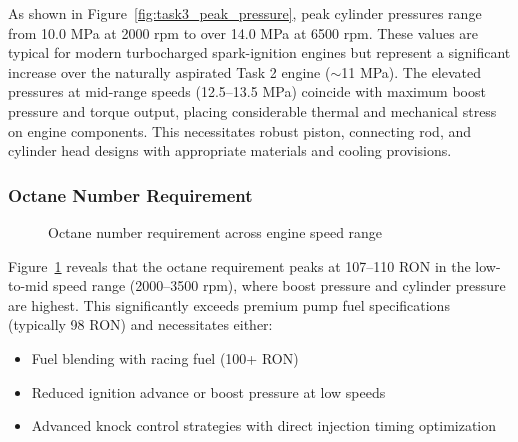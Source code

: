 As shown in Figure~\ref{fig:task3_peak_pressure}, peak cylinder pressures range from 10.0 MPa at 2000 rpm to over 14.0 MPa at 6500 rpm. These values are typical for modern turbocharged spark-ignition engines but represent a significant increase over the naturally aspirated Task 2 engine ($\sim$11 MPa). The elevated pressures at mid-range speeds (12.5--13.5 MPa) coincide with maximum boost pressure and torque output, placing considerable thermal and mechanical stress on engine components. This necessitates robust piston, connecting rod, and cylinder head designs with appropriate materials and cooling provisions.

\subsubsection{Octane Number Requirement}

\begin{figure}[H]
  \centering
  \caption{Octane number requirement across engine speed range}
  \label{fig:task3_octane}
\end{figure}

Figure~\ref{fig:task3_octane} reveals that the octane requirement peaks at 107--110 RON in the low-to-mid speed range (2000--3500 rpm), where boost pressure and cylinder pressure are highest. This significantly exceeds premium pump fuel specifications (typically 98 RON) and necessitates either:
\begin{itemize}
    \item Fuel blending with racing fuel (100+ RON)
    \item Reduced ignition advance or boost pressure at low speeds
    \item Advanced knock control strategies with direct injection timing optimization
\end{itemize}


